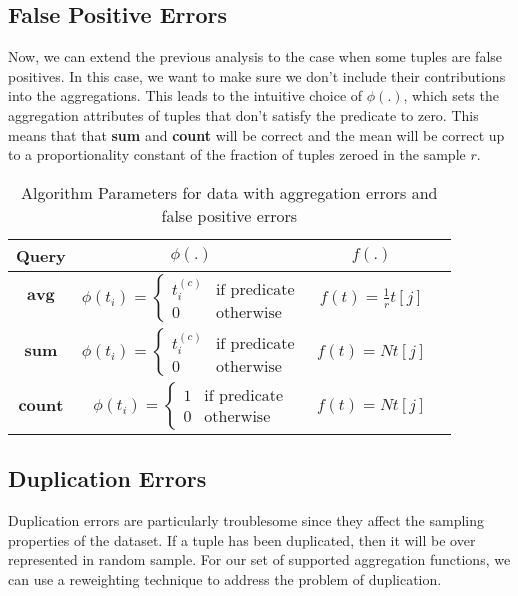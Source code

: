 \subsection{False Positive Errors}
Now, we can extend the previous analysis to the case when some tuples are false positives.
In this case, we want to make sure we don't include their contributions into the aggregations.
This leads to the intuitive choice of $\phi(.)$, which sets the aggregation attributes of tuples that don't satisfy the predicate to zero.
This means that that \textbf{sum} and \textbf{count} will be correct and the mean will be correct up to a proportionality constant of the fraction of tuples zeroed in the sample $r$.

\begin{table}[!ht]
\caption{Algorithm Parameters for data with aggregation errors and false positive errors}
\centering 
\begin{tabular}{c c c c}
\hline\hline
Query & $\phi(.)$ & $f(.)$ \\ 
\hline  %
$\textbf{avg}$ & $\phi(t_i)=\left\{
	\begin{array}{ll}
		t_i^{(c)}  & \mbox{if } \text{predicate} \\
		0 & \text{otherwise}
	\end{array}
\right.$ & $f(t)=\frac{1}{r}t[j]$ \\ %
$\textbf{sum}$ & $\phi(t_i)=\left\{
	\begin{array}{ll}
		t_i^{(c)}  & \mbox{if } \text{predicate} \\
		0 & \text{otherwise}
	\end{array}
\right.$ & $f(t)=Nt[j]$ \\
$\textbf{count}$ & $\phi(t_i)=\left\{
	\begin{array}{ll}
		1 & \mbox{if } \text{predicate} \\
		0 & \text{otherwise}
	\end{array}
\right.$ & $f(t)=Nt[j]$ \\ [1ex] %
\hline %
\end{tabular}
\end{table}

\subsection{Duplication Errors}
Duplication errors are particularly troublesome since they affect the sampling properties of the dataset.
If a tuple has been duplicated, then it will be over represented in random sample.
For our set of supported aggregation functions, we can use a reweighting technique to address the problem of duplication.

